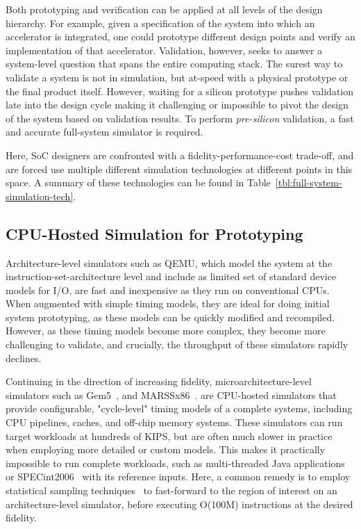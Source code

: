 Both prototyping and verification can be applied at all levels of the design
hierarchy.  For example, given a specification of the system into which an
accelerator is integrated, one could prototype different design points and
verify an implementation of that accelerator. Validation, however, seeks to
answer a system-level question that spans the entire computing stack.  The
surest way to validate a system is not in simulation, but at-speed with a
physical prototype or the final product itself. However, waiting for a silicon
prototype pushes validation late into the design cycle making it challenging or
impossible to pivot the design of the system based on validation results. To
perform \emph{pre-silicon} validation, a fast and accurate full-system
simulator is required.

Here, SoC designers are confronted with a fidelity-performance-cost trade-off,
and are forced use multiple different simulation technologies at different
points in this space. A summary of these technologies can be found in
Table~\ref{tbl:full-system-simulation-tech}.

\subsection{CPU-Hosted Simulation for Prototyping}\label{UArchSWSim}

Architecture-level simulators such as QEMU\cite{QEMU}, which model the system at the
instruction-set-architecture level and include as limited set of standard
device models for I/O, are fast and inexpensive as they run on conventional CPUs.
When augmented with simple timing models, they are ideal for doing initial system prototyping, as
these models can be quickly modified and recompiled.
However, as these timing models become more complex, they become more
challenging to validate, and crucially, the throughput of these simulators rapidly declines.

Continuing in the direction of increasing fidelity, microarchitecture-level
simulators such as Gem5~\cite{Gem5}, and MARSSx86~\cite{MARSSx86}. are CPU-hosted 
simulators that provide configurable, "cycle-level" timing models of a complete systems, including CPU pipelines,
caches, and off-chip memory systems.  These simulators can run target workloads at hundreds of KIPS, but are
often much slower in practice when employing more detailed or custom models. This
makes it practically impossible to run complete workloads, such as
multi-threaded Java applications or SPECint2006~\cite{SPEC2006} with its reference
inputs. Here, a common remedy is to employ statistical sampling
techniques~\cite{smarts} to fast-forward to the region of interest on an architecture-level simulator, before
executing O(100M) instructions at the desired fidelity.

